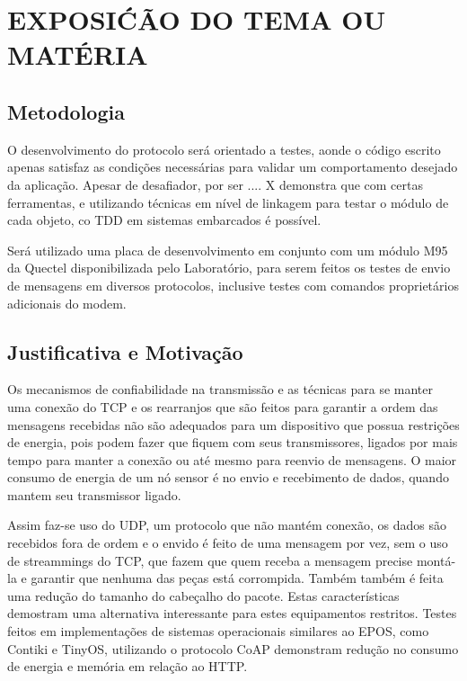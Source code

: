 

\section{EXPOSI\'C\~AO DO TEMA OU MAT\'ERIA}

\subsection{Metodologia}

O desenvolvimento do protocolo ser\'a orientado a testes, aonde o c\'odigo escrito apenas satisfaz as condiç\~oes necess\'arias para validar um comportamento desejado da aplicação.
Apesar de desafiador, por ser .... X demonstra que com certas ferramentas, e utilizando t\'ecnicas em n\'ivel de linkagem para testar o m\'odulo de cada objeto, co TDD em sistemas embarcados \'e poss\'ivel.

Ser\'a utilizado uma placa de desenvolvimento em conjunto com um m\'odulo M95 da Quectel disponibilizada pelo Laborat\'orio, para serem feitos os testes de envio de mensagens em diversos protocolos, inclusive testes com comandos propriet\'arios adicionais do modem.

\subsection{Justificativa e Motivação}

Os mecanismos de confiabilidade na transmissão e as t\'ecnicas para se manter uma conexão do TCP e os rearranjos que são feitos para garantir a ordem das mensagens recebidas não são adequados para um dispositivo que possua restriç\~oes de energia, pois podem fazer que fiquem com seus transmissores, ligados por mais tempo para manter a conexão ou at\'e mesmo para reenvio de mensagens. O maior consumo de energia de um n\'o sensor \'e no envio e recebimento de dados, quando mantem seu transmissor ligado.

Assim faz-se uso do UDP, um protocolo que não mant\'em conexão, os dados são recebidos fora de ordem e o envido \'e feito de uma mensagem por vez, sem o uso de streammings do TCP, que fazem que quem receba a mensagem precise mont\'a-la e garantir que nenhuma das peças est\'a corrompida. Tamb\'em tamb\'em \'e feita uma redução do tamanho do cabeçalho do pacote. Estas caracter\'isticas demostram uma alternativa interessante para estes equipamentos restritos. Testes feitos em implementaç\~oes de sistemas operacionais similares ao EPOS, como Contiki e TinyOS, utilizando o protocolo CoAP demonstram redução no consumo de energia e mem\'oria em relação ao HTTP.

